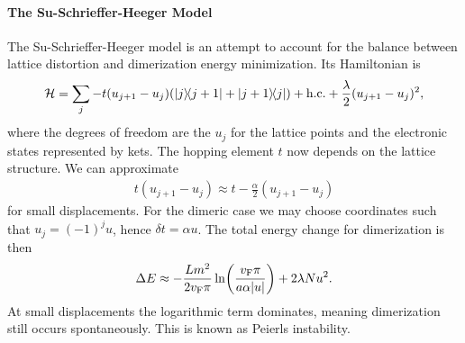 \paragraph{The Su-Schrieffer-Heeger Model}
The Su-Schrieffer-Heeger model is an attempt to account for the balance between lattice distortion and dimerization energy minimization. Its Hamiltonian is
\begin{align*}
	\mathcal{H} = \sum\limits_{j}-t(u_{j + 1} - u_{j})(\op{j}{j + 1} + \op{j + 1}{j}) + \text{h.c.} + \frac{\lambda}{2}(u_{j + 1} - u_{j})^{2},
\end{align*}
where the degrees of freedom are the $u_{j}$ for the lattice points and the electronic states represented by kets. The hopping element $t$ now depends on the lattice structure. We can approximate
\begin{align*}
	t(u_{j + 1} - u_{j}) \approx t - \frac{\alpha}{2}(u_{j + 1} - u_{j})
\end{align*}
for small displacements. For the dimeric case we may choose coordinates such that $u_{j} = (-1)^{j}u$, hence $\delta t = \alpha u$. The total energy change for dimerization is then
\begin{align*}
	\Delta E\approx -\frac{Lm^{2}}{2v_{\text{F}}\pi}\ln(\frac{v_{\text{F}}\pi}{a\alpha \abs{u}}) + 2\lambda Nu^{2}.
\end{align*}
At small displacements the logarithmic term dominates, meaning dimerization still occurs spontaneously. This is known as Peierls instability.

